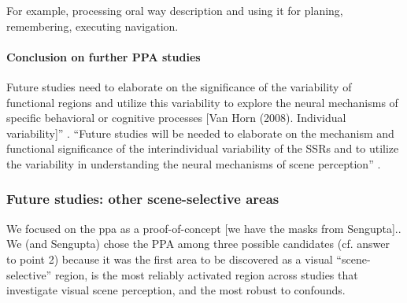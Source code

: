 %
For example, processing oral way description and using it for planing,
remembering, executing navigation.


\paragraph{Conclusion on further PPA studies}
%
Future studies need to elaborate on the significance of the variability of
functional regions and utilize this variability to explore the neural mechanisms
of specific behavioral or cognitive processes [Van Horn (2008). Individual
variability]'' \citep{zhen2015quantifying}.
%
``Future studies will be needed to elaborate on the mechanism and functional
significance of the interindividual variability of the SSRs and to utilize the
variability in understanding the neural mechanisms of scene perception''
\citep{zhen2017quantifying}.



\subsubsection{Future studies: other scene-selective areas}


We focused on the \ac{ppa} as a proof-of-concept [we have the masks from
Sengupta]..
%
We (and Sengupta) chose the PPA among three possible candidates (cf. answer to
point 2) because it was the first area to be discovered as a visual
“scene-selective” region, is the most reliably activated region across studies
that investigate visual scene perception, and the most robust to confounds.


